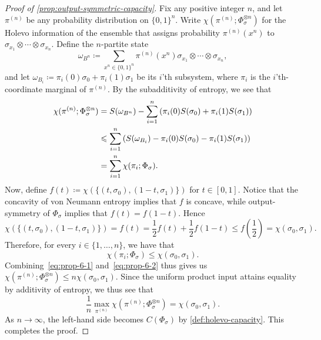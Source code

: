 \documentclass[11pt]{article}
\renewcommand{\leq}{\leqslant}
\theoremstyle{remark}
\newcommand{\bits}{\{0,1\}}
\begin{document}
\begin{proof}[Proof of \cref{prop:output-symmetric-capacity}]
Fix any positive integer $n$, and let $\pi^{(n)}$ be any probability distribution on $\bits^n$. Write $\chi(\pi^{(n)};\Phi_\sigma^{\otimes n})$ for the Holevo information of the ensemble that assigns probability $\pi^{(n)}(x^n)$ to $\sigma_{x_1} \otimes \cdots \otimes \sigma_{x_n}$. Define the $n$-partite state
\begin{equation*}
\omega_{B^n} \coloneqq \sum_{x^n \in \bits^n}{\pi^{(n)}(x^n)\sigma_{x_1} \otimes \cdots \otimes \sigma_{x_n}},
\end{equation*}
and let $\omega_{B_i} \coloneqq \pi_i(0)\sigma_0+\pi_i(1)\sigma_1$ be its $i$'th subsystem, where $\pi_i$ is the $i$'th-coordinate marginal of $\pi^{(n)}$. By the subadditivity of entropy, we see that
\begin{align}
\chi(\pi^{(n)};\Phi_\sigma^{\otimes n})
&= S(\omega_{B^n})-\sum_{i = 1}^n{\left(\pi_i(0)S(\sigma_0)+\pi_i(1)S(\sigma_1)\right)} \notag \\
&\leq \sum_{i = 1}^n{\left(S(\omega_{B_i})-\pi_i(0)S(\sigma_0)-\pi_i(1)S(\sigma_1)\right)} \notag \\
&= \sum_{i = 1}^n{\chi(\pi_i;\Phi_\sigma)}. \label{eq:prop-6-1}
\end{align}
Now, define $f(t) \coloneqq \chi(\{(t,\sigma_0),(1-t,\sigma_1)\})$ for $t \in [0,1]$. Notice that the concavity of von Neumann entropy implies that $f$ is concave, while output-symmetry of $\Phi_\sigma$ implies that $f(t) = f(1-t)$. Hence
\begin{equation*}
\chi(\{(t,\sigma_0),(1-t,\sigma_1)\}) = f(t) = \frac{1}{2}f(t)+\frac{1}{2}f(1-t) \leq f\left(\frac{1}{2}\right) = \chi(\sigma_0,\sigma_1).
\end{equation*}
Therefore, for every $i \in \{1, \ldots , n\}$, we have that
\begin{equation}
\label{eq:prop-6-2}
\chi(\pi_i;\Phi_\sigma) \leq \chi(\sigma_0,\sigma_1).
\end{equation}
Combining~\eqref{eq:prop-6-1} and~\eqref{eq:prop-6-2} thus gives us $\chi(\pi^{(n)};\Phi_\sigma^{\otimes n}) \leq n\chi(\sigma_0,\sigma_1)$. Since the uniform product input attains equality by additivity of entropy, we thus see that
\begin{equation*}
\frac{1}{n}\max_{\pi^{(n)}}\chi(\pi^{(n)};\Phi_\sigma^{\otimes n})
= \chi(\sigma_0,\sigma_1).
\end{equation*}
As $n \to \infty$, the left-hand side becomes $C(\Phi_\sigma)$ by \cref{def:holevo-capacity}. This completes the proof.\qedhere
\end{proof}
\end{document}
